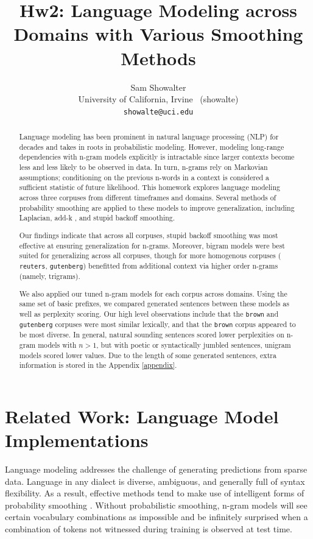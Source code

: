 \documentclass[11pt,a4paper]{article}
\title{Hw2: Language Modeling across Domains with Various Smoothing Methods}
\author{Sam Showalter \\
  University of California, Irvine \ (showalte) \\  
\texttt{showalte@uci.edu}}
\date{}
\begin{document}
\maketitle
\begin{abstract} 
  Language modeling has been prominent in natural language processing (NLP) for
  decades and takes in roots in probabilistic modeling. 
  However, modeling long-range dependencies with n-gram models explicitly is intractable since
  larger contexts become less and less likely to be observed in data. In turn, n-grams rely on Markovian assumptions;
  conditioning on the previous n-words in a context is considered a sufficient statistic of future likelihood. This homework 
  explores language modeling across three corpuses from different timeframes and domains. Several
  methods of probability smoothing are applied to these models to improve generalization, including Laplacian, add-k
  , and stupid backoff \cite{brants2007large} smoothing. 

  Our findings indicate that across all corpuses, stupid backoff smoothing was most effective at ensuring generalization for n-grams. Moreover, 
  bigram models were best suited for generalizing across all corpuses, though for more homogenous corpuses ( \texttt{reuters}, \texttt{gutenberg})
  benefitted from additional context via higher order n-grams (namely, trigrams).

  We also applied our tuned n-gram models for each corpus across domains. Using the same set of basic 
  prefixes, we compared generated sentences between these models as well as perplexity scoring.
  Our high level observations include that the \texttt{brown} and \texttt{gutenberg} corpuses were most similar lexically, and that
  the \texttt{brown} corpus appeared to be most diverse. In general, natural sounding sentences scored lower perplexities on 
  n-gram models with $ n > 1$, but with poetic or syntactically jumbled sentences, unigram models scored lower values. Due to the length of 
  some generated sentences, extra information is stored in the Appendix \ref{appendix}. 
\end{abstract}


\section{Related Work: Language Model Implementations}

Language modeling addresses the challenge of generating predictions from sparse data. Language in any
dialect is diverse, ambiguous, and generally full of syntax flexibility. As a result, effective methods 
tend to make use of intelligent forms of probability smoothing \cite{chen1999empirical}.
Without probabilistic smoothing, n-gram models will see certain vocabulary combinations as impossible \cite{jelinek1980interpolated} and be
infinitely surprised when a combination of tokens not witnessed during training is observed at test time.
\end{document}
